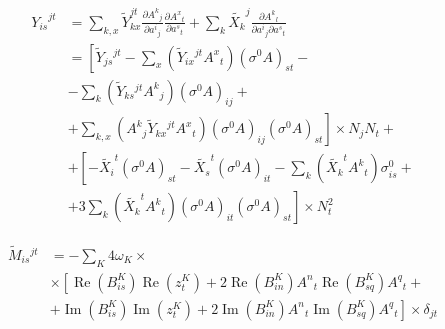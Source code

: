 \documentclass[aps,prl,reprint,amsmath,amssymb]{revtex4-1}
\begin{document}
%
\begin{equation} \label{eq:hessian-convert}
\begin{split}
{Y_{is}}^{jt} &= \sum_{k,x} \tilde{Y}_{kx}^{jt} \frac{\partial {A^k}_j}{\partial {a^i}_j} \frac{\partial {A^x}_t}{\partial {a^s}_t} + \sum_{k} \tilde{X_k}^j \frac{\partial {A^k}_l}{\partial {a^i}_j \partial{a^s}_t}  \\
&= \left[ \tilde{Y}{_{js}}^{jt} - \sum_{x}\left(\tilde{Y}{_{ix}}^{jt} {A^x}_t \right)\left(\sigma^0 A\right)_{st} - \right.\\
&\left. - \sum_{k}\left(\tilde{Y}{_{ks}}^{jt} {A^k}_j\right)\left(\sigma^0 A\right)_{ij} + \right.\\
&\left. + \sum_{k,x}\left({A^k}_j \tilde{Y}{_{kx}}^{jt} {A^x}_t\right)\left(\sigma^0 A\right)_{ij}\left(\sigma^0 A\right)_{st} \right] \times N_j N_t + \\
&+ \left[ -\tilde{X_i}^t \left(\sigma^0 A \right)_{st} - \tilde{X_s}^t \left(\sigma^0 A \right)_{it} - \sum_{k} \left( \tilde{X_k}^t {A^k}_t \right)\sigma^0_{is}  + \right.\\
&\left. + 3 \sum_{k} \left(\tilde{X_k}^t {A^k}_t \right) \left(\sigma^0 A\right)_{it} \left(\sigma^0 A\right)_{st} \right] \times N_{t}^2
\end{split}
\end{equation}
%


%
\begin{equation} \label{eq:hessian-loc}
\begin{split}
\tilde{M}{_{is}}^{jt} &= - \sum_K {4 \omega_K} \times \\ 
&\times \left[  \operatorname{Re}(B^{K}_{is}) \operatorname{Re}(z_{t}^{K}) + 2 \operatorname{Re}(B^{K}_{in}){A^{n}}_{t} \operatorname{Re}(B^{K}_{sq}){A^{q}}_{t} +  \right. \\
&\left. + \operatorname{Im}(B^{K}_{is}) \operatorname{Im}(z_{t}^{K}) + 2 \operatorname{Im}(B^{K}_{in}){A^{n}}_{t} \operatorname{Im}(B^{K}_{sq}){A^{q}}_{t}  \right] \times \delta_{jt}
\end{split}
\end{equation}
%
\end{document}
